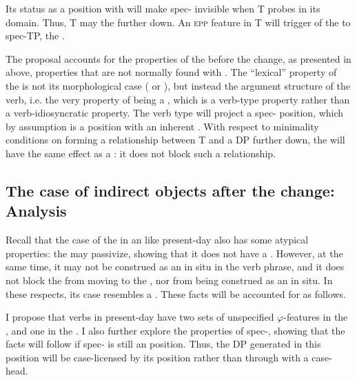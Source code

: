 \documentclass[output=paper]{langscibook}
\begin{document}
Its status as a position with  will make spec- invisible when T probes in its  domain. Thus, T may  the  further down. An \textsc{epp} feature in T will trigger  of the  to spec-TP, the .


\begin{sloppypar}
The proposal accounts for the properties of the  before the change, as presented in  above, properties that are not normally found with . The “lexical” property of the  is not its morphological case ( or ), but instead the argument structure of the verb, i.e. the very property of being a , which is a verb-type property rather than a verb-idiosyncratic property. The verb type will project a spec- position, which by assumption is a position with an inherent . With respect to minimality conditions on forming a relationship between T and a DP further down, the  will have the same effect as a : it does not block such a relationship.
\end{sloppypar}

\subsection{The case of indirect objects after the change: Analysis}\label{sec:falk:4.3}


Recall that the case of the  in an  like present-day  also has some atypical properties: the  may passivize, showing that it does not have a . However, at the same time, it may not be construed as an  in situ in the verb phrase, and it does not block the  from moving to the , nor from being construed as an  in situ. In these respects, its case resembles a . These facts will be accounted for as follows. 


I propose that  verbs in present-day  have two sets of unspecified $\varphi $-features in the , and one in the . I also further explore the properties of spec-, showing that the facts will follow if spec- is still an  position. Thus, the DP generated in this position will be case-licensed by its position rather than through  with a case- head.
\end{document}
